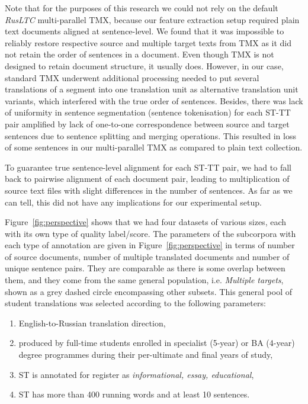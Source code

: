 \vspace{-1em}

Note that for the purposes of this research we could not rely on the default \textit{RusLTC} multi-parallel TMX, because our feature extraction setup required plain text documents aligned at sentence-level. We found that it was impossible to reliably restore respective source and multiple target texts from TMX as it did not retain the order of sentences in a document. Even though TMX is not designed to retain document structure, it usually does. However, in our case, standard TMX underwent additional processing needed to put several translations of a segment into one translation unit as alternative translation unit variants, which interfered with the true order of sentences. Besides, there was lack of uniformity in sentence segmentation (sentence tokenisation) for each ST-TT pair amplified by lack of one-to-one correspondence between source and target sentences due to sentence splitting and merging operations. This resulted in loss of some sentences in our multi-parallel TMX as compared to plain text collection.

To guarantee true sentence-level alignment for each ST-TT pair, we had to fall back to pairwise alignment of each document pair, leading to multiplication of source text files with slight differences in the number of sentences. As far as we can tell, this did not have any implications for our experimental setup.

Figure~\ref{fig:perspective} shows that we had four datasets of various sizes, each with its own type of quality label/score. The parameters of the subcorpora with each type of annotation are given in Figure~\ref{fig:perspective} in terms of number of source documents, number of multiple translated documents and number of unique sentence pairs.  
They are comparable as there is some overlap between them, and they come from the same general population, i.e. \textit{Multiple targets}, shown as a grey dashed circle encompassing other subsets. This general pool of student translations was selected according to the following parameters:
\begin{enumerate}\compresslist{}
	\item English-to-Russian translation direction,
	\item produced by full-time students enrolled in specialist (5-year) or BA (4-year) degree programmes during their per-ultimate and final years of study,
    \item ST is annotated for register as \textit{informational, essay, educational},
    \item ST has more than 400 running words and at least 10 sentences.
\end{enumerate}

